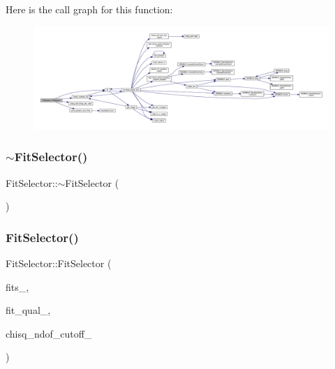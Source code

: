 Here is the call graph for this function\+:
\nopagebreak
\begin{figure}[H]
\begin{center}
\leavevmode
\includegraphics[width=350pt]{d0/d5e/classFitSelector_ae27f9d457dfeda289eaf27533c2740fc_cgraph}
\end{center}
\end{figure}
\mbox{\label{classFitSelector_a346a5fc560a0829bce8f823ee5b51719}} 
\subsubsection{\texorpdfstring{$\sim$FitSelector()}{~FitSelector()}\hspace{0.1cm}{\footnotesize\ttfamily [1/2]}}
{\footnotesize\ttfamily Fit\+Selector\+::$\sim$\+Fit\+Selector (\begin{DoxyParamCaption}{ }\end{DoxyParamCaption})\hspace{0.3cm}{\ttfamily [inline]}}

\mbox{\label{classFitSelector_ae27f9d457dfeda289eaf27533c2740fc}} 
\subsubsection{\texorpdfstring{FitSelector()}{FitSelector()}\hspace{0.1cm}{\footnotesize\ttfamily [2/2]}}
{\footnotesize\ttfamily Fit\+Selector\+::\+Fit\+Selector (\begin{DoxyParamCaption}\item[{const vector$<$ \mbox{\hyperlink{classAvgFit}{Avg\+Fit}} $\ast$ $>$ \&}]{fits\+\_\+,  }\item[{\mbox{\hyperlink{classFitQuality}{Fit\+Quality}} $\ast$}]{fit\+\_\+qual\+\_\+,  }\item[{double}]{chisq\+\_\+ndof\+\_\+cutoff\+\_\+ }\end{DoxyParamCaption})}


